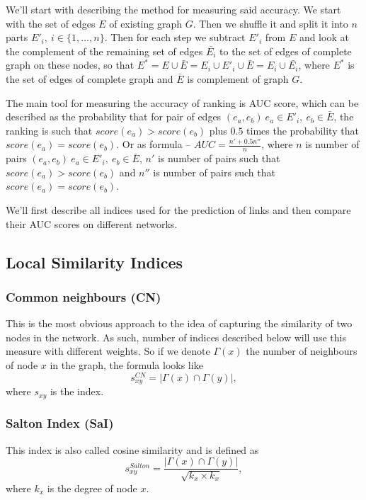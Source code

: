 \documentclass{llncs}
\begin{document}
We'll start with describing the method for measuring said accuracy. We start with the set of edges $E$ of existing graph $G$. Then we shuffle it and split it into $n$ parts $E'_i, \ i \in \{1, \ldots, n\}$. Then for each step we subtract $E'_i$ from $E$ and look at the complement of the remaining set of edges $\bar{E_i}$ to the set of edges of complete graph on these nodes, so that $E^* = E \cup \bar{E} = E_i \cup E'_i \cup \bar{E} = E_i \cup \bar{E_i}$, where $E^*$ is the set of edges of complete graph and $\bar{E}$ is complement of graph $G$.

The main tool for measuring the accuracy of ranking is AUC score, which can be described as the probability that for pair of edges $(e_a, e_b) \ e_a \in E'_i, \ e_b \in \bar{E}$, the ranking is such that $score(e_a) > score(e_b)$ plus $0.5$ times the probability that $score(e_a) = score(e_b)$. Or as formula -- $AUC = \frac{n' + 0.5 n''}{n}$, where $n$ is number of pairs $(e_a, e_b) \ e_a \in E'_i, \ e_b \in \bar{E}$, $n'$ is number of pairs such that $score(e_a) > score(e_b)$ and $n''$ is number of pairs such that $score(e_a) = score(e_b)$.

We'll first describe all indices used for the prediction of links and then compare their AUC scores on different networks.
%
\subsection{Local Similarity Indices}
%
\subsubsection{Common neighbours (CN)}
%
This is the most obvious approach to the idea of capturing the similarity of two nodes in the network. As such, number of indices described below will use this measure with different weights. So if we denote $\Gamma(x)$ the number of neighbours of node $x$ in the graph, the formula looks like
\begin{equation}
s_{xy}^{CN} = |\Gamma(x) \cap \Gamma(y)|,
\end{equation}
where $s_{xy}$ is the index.
%
\subsubsection{Salton Index (SaI)}
%
This index is also called cosine similarity and is defined as
\begin{equation}
s_{xy}^{Salton} = \frac{|\Gamma(x) \cap \Gamma(y)|}{\sqrt{k_x \times k_x}},
\end{equation}
where $k_x$ is the degree of node $x$.
%
\end{document}
